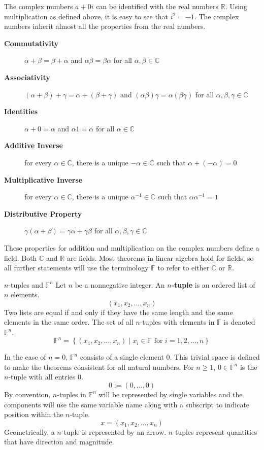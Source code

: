 \documentclass{book}
\newcommand{\real}{\mathbb{R}}
\newcommand{\complex}{\mathbb{C}}
\newcommand{\field}{\mathbb{F}}
\newcommand{\set}[2]{\left\{#1\;\vert\;#2\right\}}
\theoremstyle{definition}
\begin{document}
\noindent The complex numbers $a+0i$ can be identified with the real numbers 
$\real$. Using multiplication as defined above, it is easy to see that $i^2=-1$.
The complex numbers inherit almost all the properties from the real numbers.
\begin{description}
    \item[ \textbf{Commutativity}] $\alpha+\beta=\beta+\alpha$ and 
        $\alpha\beta = \beta\alpha$ for all $\alpha,\beta\in\complex$ 
    \item[ \textbf{Associativity}] $(\alpha+\beta)+\gamma = 
        \alpha+(\beta+\gamma)$ and $(\alpha\beta)\gamma =
        \alpha(\beta\gamma)$ for all $\alpha,\beta,\gamma\in\complex$ 
    \item[ \textbf{Identities}] $\alpha+0 = \alpha$ and $\alpha 1 = \alpha$
        for all $\alpha\in\complex$ 
    \item[ \textbf{Additive Inverse}] for every $\alpha\in\complex$, there is a
        unique $-\alpha\in\complex$ such that $\alpha +(-\alpha) = 0$ 
    \item[ \textbf{Multiplicative Inverse}] for every $\alpha\in\complex$, there is a
        unique $\alpha^{-1}\in\complex$ such that $\alpha\alpha^{-1} = 1$ 
    \item[ \textbf{Distributive Property}] $\gamma(\alpha+\beta) = \gamma\alpha 
        + \gamma\beta$ for all $\alpha,\beta,\gamma\in\complex$ 
\end{description}

\noindent These properties for addition and multiplication on the complex 
numbers define a field. Both $\complex$ and $\real$ are fields. Most 
theorems in linear algebra hold for fields, so all further statements will use 
the terminology $\field$ to refer to either $\complex$  or $\real$.

\begin{definition}{$n$-tuples and $\field^n$}
    Let $n$ be a nonnegative integer. An \textbf{$n$-tuple} is an ordered list
    of $n$ elements.
    \[
        (x_1,x_2,\dots,x_n)
    \]
    Two lists are equal if and only if they have the same length and the same
    elements in the same order. The set of all $n$-tuples with elements in
    $\field$ is denoted $\field^n$.
    \[
        \field^n = \set{(x_1,x_2,\dots,x_n)}{x_i\in\field\text{ for }i = 1,2,
            \dots,n}
    \]
\end{definition}

\noindent In the case of $n=0$, $\field^n$ consists of a single element $0$. This
trivial space is defined to make the theorems consistent for all natural
numbers. For $n\geq1$, $0\in\field^n$ is the $n$-tuple with all entries 0.
\[
    0 := (0,\dots,0)
\]
By convention, $n$-tuples in $\field^n$ will be represented by single variables
and the components will use the same variable name along with a subscript to
indicate position within the $n$-tuple.
\[
    x = (x_1,x_2,\dots,x_n)
\]
Geometrically, a $n$-tuple is represented by an arrow. $n$-tuples represent
quantities that have direction and magnitude.
\end{document}
